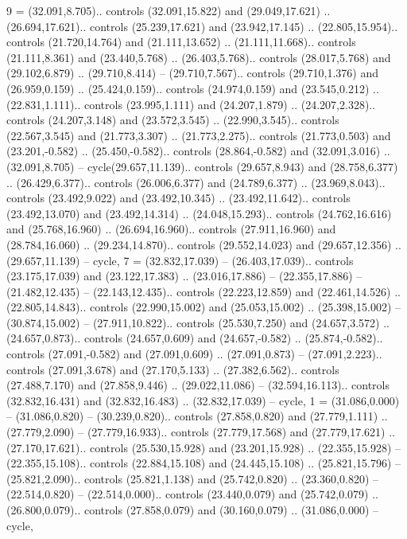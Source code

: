 {9} = {(32.091,8.705).. controls (32.091,15.822) and (29.049,17.621) .. (26.694,17.621).. controls (25.239,17.621) and (23.942,17.145) .. (22.805,15.954).. controls (21.720,14.764) and (21.111,13.652) .. (21.111,11.668).. controls (21.111,8.361) and (23.440,5.768) .. (26.403,5.768).. controls (28.017,5.768) and (29.102,6.879) .. (29.710,8.414) -- (29.710,7.567).. controls (29.710,1.376) and (26.959,0.159) .. (25.424,0.159).. controls (24.974,0.159) and (23.545,0.212) .. (22.831,1.111).. controls (23.995,1.111) and (24.207,1.879) .. (24.207,2.328).. controls (24.207,3.148) and (23.572,3.545) .. (22.990,3.545).. controls (22.567,3.545) and (21.773,3.307) .. (21.773,2.275).. controls (21.773,0.503) and (23.201,-0.582) .. (25.450,-0.582).. controls (28.864,-0.582) and (32.091,3.016) .. (32.091,8.705) -- cycle(29.657,11.139).. controls (29.657,8.943) and (28.758,6.377) .. (26.429,6.377).. controls (26.006,6.377) and (24.789,6.377) .. (23.969,8.043).. controls (23.492,9.022) and (23.492,10.345) .. (23.492,11.642).. controls (23.492,13.070) and (23.492,14.314) .. (24.048,15.293).. controls (24.762,16.616) and (25.768,16.960) .. (26.694,16.960).. controls (27.911,16.960) and (28.784,16.060) .. (29.234,14.870).. controls (29.552,14.023) and (29.657,12.356) .. (29.657,11.139) -- cycle},
{7} = {(32.832,17.039) -- (26.403,17.039).. controls (23.175,17.039) and (23.122,17.383) .. (23.016,17.886) -- (22.355,17.886) -- (21.482,12.435) -- (22.143,12.435).. controls (22.223,12.859) and (22.461,14.526) .. (22.805,14.843).. controls (22.990,15.002) and (25.053,15.002) .. (25.398,15.002) -- (30.874,15.002) -- (27.911,10.822).. controls (25.530,7.250) and (24.657,3.572) .. (24.657,0.873).. controls (24.657,0.609) and (24.657,-0.582) .. (25.874,-0.582).. controls (27.091,-0.582) and (27.091,0.609) .. (27.091,0.873) -- (27.091,2.223).. controls (27.091,3.678) and (27.170,5.133) .. (27.382,6.562).. controls (27.488,7.170) and (27.858,9.446) .. (29.022,11.086) -- (32.594,16.113).. controls (32.832,16.431) and (32.832,16.483) .. (32.832,17.039) -- cycle},
{1} = {(31.086,0.000) -- (31.086,0.820) -- (30.239,0.820).. controls (27.858,0.820) and (27.779,1.111) .. (27.779,2.090) -- (27.779,16.933).. controls (27.779,17.568) and (27.779,17.621) .. (27.170,17.621).. controls (25.530,15.928) and (23.201,15.928) .. (22.355,15.928) -- (22.355,15.108).. controls (22.884,15.108) and (24.445,15.108) .. (25.821,15.796) -- (25.821,2.090).. controls (25.821,1.138) and (25.742,0.820) .. (23.360,0.820) -- (22.514,0.820) -- (22.514,0.000).. controls (23.440,0.079) and (25.742,0.079) .. (26.800,0.079).. controls (27.858,0.079) and (30.160,0.079) .. (31.086,0.000) -- cycle},
